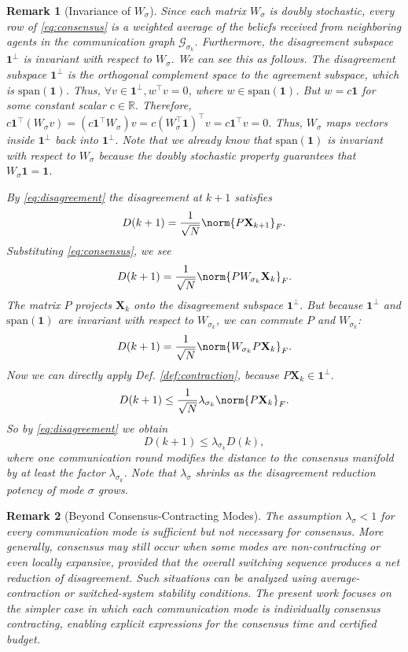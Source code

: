 \documentclass[journal,twoside,web]{ieeecolor_no_firstpage_logo}
\newtheorem{remark}{Remark}
\begin{document}
\begin{remark}[Invariance of $W_\sigma$]
Since each matrix $W_\sigma$ is doubly stochastic,
every row of \eqref{eq:consensus} is a weighted average of the beliefs
received from neighboring agents in the communication graph
$\mathcal G_{\sigma_k}$. Furthermore, the disagreement subspace $\mathbf 1^\perp$ is invariant with respect to $W_\sigma.$ We can see this as follows. The disagreement subspace $\mathbf 1^\perp$ is the orthogonal complement space to the agreement subspace, which is $\text{span}(\mathbf 1)$. Thus, $\forall v \in \mathbf 1^\perp, w^\top v = 0$, where $w \in \text{span}(\mathbf 1)$. But $w = c \mathbf 1$ for some constant scalar $c \in \mathbb{R}.$ Therefore, $c \mathbf 1^\top (W_\sigma v)=(c\mathbf 1^\top W_\sigma)v = c(W_\sigma^\top \mathbf 1)^\top v = c\mathbf 1^\top v = 0.$ Thus, $W_\sigma$ maps vectors inside $\mathbf 1^\perp$ back into $\mathbf 1^\perp.$ Note that we already know that $\text{span}(\mathbf 1)$ is invariant with respect to $W_\sigma$ because the doubly stochastic property guarantees that $W_\sigma \mathbf 1 = \mathbf 1.$ 

By \eqref{eq:disagreement} the disagreement at $k+1$ satisfies
$$
D(k+1) = \frac{1}{\sqrt{N}} \norm{P \mathbf{X}_{k+1}}_F.
$$
Substituting \eqref{eq:consensus}, we see
$$
D(k+1) = \frac{1}{\sqrt{N}}\norm{PW_{\sigma_k}\mathbf{X}_k}_F.
$$
The matrix $P$ projects $\mathbf{X}_k$ onto the disagreement subspace $\mathbf 1^\perp.$ But because $\mathbf 1^\perp$ and $\text{span}(\mathbf 1
)$ are invariant with respect to $W_{\sigma_k}$, we can commute $P$ and $W_{\sigma_k}$:
$$
D(k+1) = \frac{1}{\sqrt{N}}\norm{W_{\sigma_k}P\mathbf{X}_k}_F.
$$
Now we can directly apply Def. \ref{def:contraction}, because $P\mathbf{X}_k \in \mathbf 1^\perp.$ 
$$
D(k+1) \leq \frac{1}{\sqrt{N}} \lambda_{\sigma_k} \norm{P \mathbf{X}_k}_F.
$$
So by \eqref{eq:disagreement} we obtain
\begin{equation} \label{eq:contracting}
D(k+1)
\le
\lambda_{\sigma_k}D(k),
\end{equation}
where one communication round modifies the distance to the consensus
manifold by at least the factor $\lambda_{\sigma_k}$. Note that $\lambda_\sigma$ shrinks as the disagreement reduction potency of mode $\sigma$ grows. 
\end{remark}

\begin{remark}[Beyond Consensus-Contracting Modes]
The assumption $\lambda_\sigma<1$ for every communication mode is
sufficient but not necessary for consensus. More generally, consensus
may still occur when some modes are non-contracting or even locally
expansive, provided that the overall switching sequence produces a net
reduction of disagreement. Such situations can be analyzed using
average-contraction or switched-system stability conditions. The
present work focuses on the simpler case in which each communication
mode is individually consensus contracting, enabling explicit
expressions for the consensus time and certified budget.
\end{remark}
\end{document}
